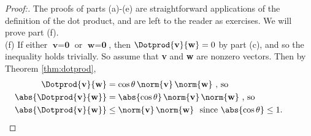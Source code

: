 \begin{proofbar}\vspace{-3mm}\begin{proof}[Proof:]
 The proofs of parts (a)-(e) are straightforward applications of the definition of the dot product, and are left
 to the reader as exercises. We will prove part (f).\\(f)
 If either $\textbf{v} = \textbf{0}$ or $\textbf{w} = \textbf{0}$, then $\Dotprod{\textbf{v}}{\textbf{w}} = 0$
 by part (c), and so the inequality holds trivially. So assume that \textbf{v} and \textbf{w} are nonzero vectors. Then
 by Theorem \ref{thm:dotprod},
 \begin{align*}
  \Dotprod{\textbf{v}}{\textbf{w}} &= \cos \theta \, \norm{\textbf{v}}\,\norm{\textbf{w}} \text{~,~so}\\
  \abs{\Dotprod{\textbf{v}}{\textbf{w}}} &= \abs{\cos \theta} \, \norm{\textbf{v}}\,\norm{\textbf{w}} \text{~,~so}\\
  \abs{\Dotprod{\textbf{v}}{\textbf{w}}} &\le \norm{\textbf{v}}\,\norm{\textbf{w}}
   \text{~~since $\abs{\cos \theta} \le 1$. \qquad \qedhere}
 \end{align*}
\end{proof}\vspace{-3mm}\end{proofbar}

